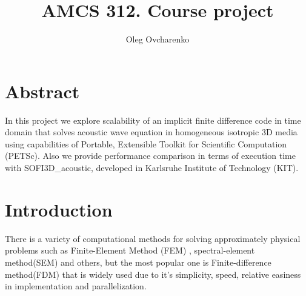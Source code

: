 \documentclass[12pt,a4paper]{report}
\title{AMCS 312. Course project}
\author{Oleg Ovcharenko}
\begin{document}
\maketitle

\section*{Abstract}
In this project we explore scalability of an implicit finite difference code in time domain that solves acoustic wave equation in homogeneous isotropic 3D media using capabilities of Portable, Extensible Toolkit for Scientific Computation (PETSc). Also we provide performance comparison in terms of execution time with SOFI3D\_acoustic, developed in Karlsruhe Institute of Technology (KIT).

\section*{Introduction}

There is a variety of computational methods for solving approximately physical problems such as Finite-Element Method (FEM) \citep{strang1973analysis}, spectral-element method(SEM) \citep{komatitsch1999introduction} and others, but the most popular one is Finite-difference method(FDM) that is widely used due to it's simplicity, speed, relative easiness in implementation and parallelization.
\end{document}
